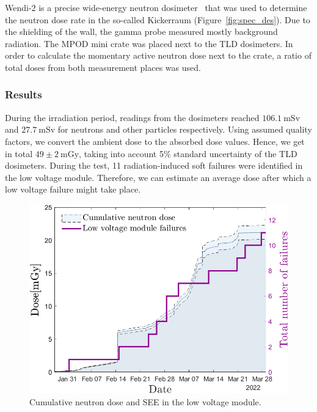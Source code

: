 Wendi-2 is a precise wide-energy neutron dosimeter~\cite{wendi} that was used to determine the neutron dose rate in the so-called Kickerraum (Figure~\ref{fig:spec_des}). Due to the shielding of the wall, the gamma probe measured mostly background radiation. The MPOD mini crate was placed next to the TLD dosimeters. In order to calculate the momentary active neutron dose next to the crate, a ratio of total doses from both measurement places was used. 
\newpage
\subsubsection{Results}
During the irradiation period, readings from the dosimeters reached $106.1\mathrm{\ mSv}$ and $27.7\mathrm{\ mSv}$ for neutrons and other particles respectively.
Using assumed quality factors, we convert the ambient dose to the absorbed dose values. Hence, we get in total $49\pm{2}\mathrm{\ mGy}$, taking into account 5\% standard uncertainty of the TLD dosimeters. During the test, 11 radiation-induced soft failures were identified in the low voltage module. Therefore, we can estimate an average dose after which a low voltage failure might take place.
\begin{figure}[!h]
    \centering
    \includegraphics[width=0.6\columnwidth]{Chapter4/images/LV_failure_and_neutronsrate.png}
    \caption{Cumulative neutron dose and \gls{SEE} in the low voltage module.}
    \label{fig:lv_neutrons}
\end{figure}
